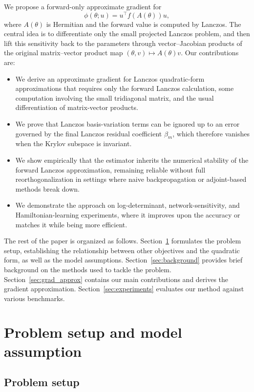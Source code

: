 \documentclass{article}
\begin{document}
We propose a forward-only approximate gradient for
\[
    \phi(\theta;u)=u^\top f(A(\theta))u,
\]
where \(A(\theta)\) is Hermitian and the forward value is computed by Lanczos. The central idea is to differentiate only the small projected Lanczos problem, and then lift this sensitivity back to the parameters through vector--Jacobian products of the original matrix--vector product map \((\theta,v)\mapsto A(\theta)v\). Our contributions are:
\begin{itemize}
    \item We derive an approximate gradient for Lanczos quadratic-form approximations that requires only the forward Lanczos calculation, some computation involving the small tridiagonal matrix, and the usual differentiation of matrix-vector products.
    \item We prove that Lanczos basis-variation terms can be ignored up to an error governed by the final Lanczos residual coefficient \(\beta_m\), which therefore vanishes when the Krylov subspace is invariant.
    \item We show empirically that the estimator inherits the numerical stability of the forward Lanczos approximation, remaining reliable without full reorthogonalization in settings where naive backpropagation or adjoint-based methods break down.
    \item We demonstrate the approach on log-determinant, network-sensitivity, and Hamiltonian-learning experiments, where it improves upon the accuracy or matches it while being more efficient.
\end{itemize}

The rest of the paper is organized as follows. Section~\ref{sec:problem} formulates the problem setup, establishing the relationship between other objectives and the quadratic form, as well as the model assumptions. Section~\ref{sec:background} provides brief background on the methods used to tackle the problem. Section~\ref{sec:grad_approx} contains our main contributions and derives the gradient approximation. Section~\ref{sec:experiments} evaluates our method against various benchmarks.



\section{Problem setup and model assumption}
\label{sec:problem}
\subsection{Problem setup}
\end{document}
